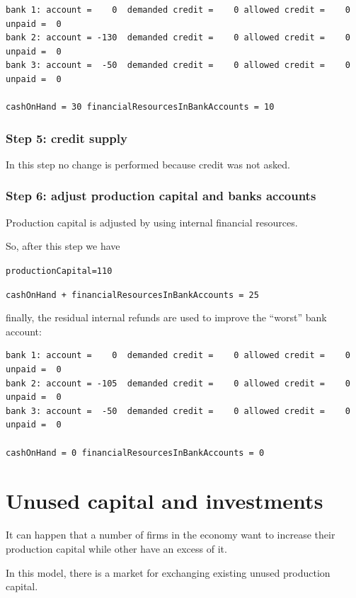 \documentclass{article}
\begin{document}
\begin{verbatim}
bank 1: account =    0  demanded credit =    0 allowed credit =    0 unpaid =  0
bank 2: account = -130  demanded credit =    0 allowed credit =    0 unpaid =  0
bank 3: account =  -50  demanded credit =    0 allowed credit =    0 unpaid =  0

cashOnHand = 30 financialResourcesInBankAccounts = 10
\end{verbatim}

	\subsubsection*{Step 5: credit supply}
In this step no change is performed because credit was not asked.

	\subsubsection*{Step 6: adjust production capital and banks accounts}

	Production capital is adjusted by using internal financial resources. 

	So, after this step we have

	\verb+productionCapital=110+

	\verb/cashOnHand + financialResourcesInBankAccounts = 25/

	finally, the residual internal refunds are used to improve the ``worst'' bank account:

\begin{verbatim}
bank 1: account =    0  demanded credit =    0 allowed credit =    0 unpaid =  0
bank 2: account = -105  demanded credit =    0 allowed credit =    0 unpaid =  0
bank 3: account =  -50  demanded credit =    0 allowed credit =    0 unpaid =  0

cashOnHand = 0 financialResourcesInBankAccounts = 0
\end{verbatim}





\section{Unused capital and investments}

It can happen that a number of firms in the economy want to increase their production capital while other have an excess of it.

In this model, there is a market for exchanging existing unused production capital.
\end{document}
